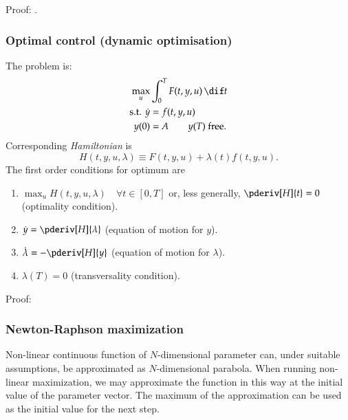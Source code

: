 \documentclass[a4paper]{article}
\numberwithin{equation}{subsection}
\begin{document}
Proof: \citet{chiang1984}.



\newpage
\subsubsection{Optimal control (dynamic optimisation)}

The problem is:
\begin{equation}
  \begin{split}
    \max_u & \int_0^T F(t, y, u) \,\dif t\\
    \text{s.t. }
    \dot y & = f(t, y, u)\\
    y(0) & = A
    \qquad
    y(T) \text{ free}.
  \end{split}
\end{equation}
Corresponding \emph{Hamiltonian} is
\begin{equation}
  H(t, y, u, \lambda)
  \equiv
  F(t, y, u) +
  \lambda(t) f(t, y, u).
\end{equation}
The first order conditions for optimum are
\begin{enumerate}
\item $\max_u H(t, y, u, \lambda) \quad\forall t \in [0,T]$ or, less
  generally, $\pderiv[H]{t} = 0$ (optimality condition).
\item $\dot y = \pderiv[H]{\lambda}$ (equation of motion for $y$).
\item $\dot \lambda = - \pderiv[H]{y}$ (equation of motion for $\lambda$).
\item $\lambda(T) = 0$ (transversality condition).
\end{enumerate}

Proof: \citet{miller1979}



\subsubsection{Newton-Raphson maximization}
\label{sec:Newton-Raphson}

Non-linear continuous function of $N$-dimensional parameter can,
under suitable assumptions, be approximated as $N$-dimensional parabola.
When running non-linear maximization, we may approximate the function
in this way at the initial value of the parameter vector.  The maximum
of the approximation can be used as the initial value for the next
step.
\end{document}
